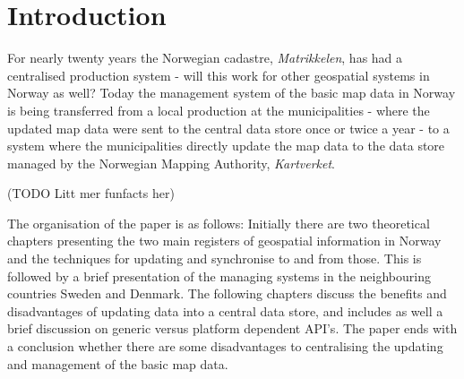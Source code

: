 \chapter{Introduction}
For nearly twenty years the Norwegian cadastre, \textit{Matrikkelen}, has had a centralised production system - will this work for other geospatial systems in Norway as well? Today the management system of the basic map data in Norway is being transferred from a local production at the municipalities - where the updated map data were sent to the central data store once or twice a year - to a system where the municipalities directly update the map data to the data store managed by the Norwegian Mapping Authority, \textit{Kartverket}. 

(TODO Litt mer funfacts her)



The organisation of the paper is as follows: Initially there are two theoretical chapters presenting the two main registers of geospatial information in Norway and the techniques for updating and synchronise to and from those. This is followed by a brief presentation of the managing systems in the neighbouring countries Sweden and Denmark. The following chapters discuss the benefits and disadvantages of updating data into a central data store, and includes as well a brief discussion on generic versus platform dependent API's. The paper ends with a conclusion whether there are some disadvantages to centralising the updating and management of the basic map data.

